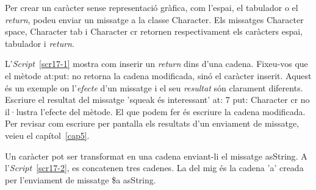 Per crear un caràcter sense representació gràfica, com l'espai, el tabulador o el \emph{return}, podeu enviar un missatge a la classe \textsf{Character}. Els missatges \textsf{Character space}, \textsf{Character tab} i \textsf{Character cr} retornen respectivament els caràcters espai, tabulador i \emph{return}.    

L'\emph{Script}~\ref{scr17-1} mostra com inserir un \emph{return} dins d'una cadena. Fixeu-vos que el mètode \textsf{at:put:} no retorna la cadena modificada, sinó el caràcter inserit. Aquest és un exemple on l'\emph{efecte} d'un missatge i el seu \emph{resultat} són clarament diferents. Escriure el resultat del missatge \textsf{'squeak és interessant' at: 7 put: Character cr} no il·lustra l'efecte del mètode. El que podem fer és escriure la cadena modificada. Per revisar com escriure per pantalla els resultats d'un enviament de missatge, veieu el capítol~\ref{cap5}.

Un caràcter pot ser transformat en una cadena enviant-li el missatge \textsf{asString}. A l'\emph{Script}~\ref{scr17-2}, es concatenen tres cadenes. La del mig és la cadena \textsf{'a'} creada per l'enviament de missatge \textsf{\$a asString}.

